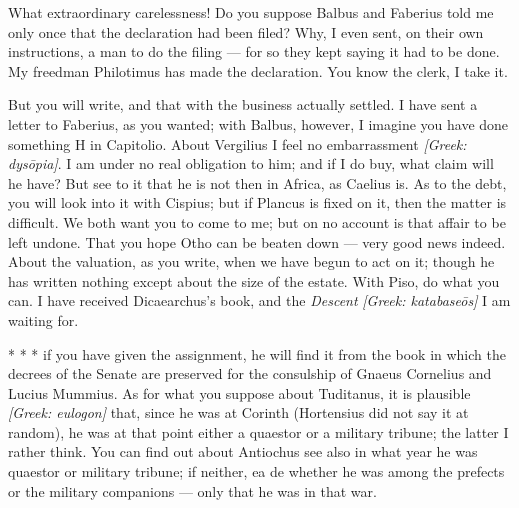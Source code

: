 

 What extraordinary carelessness! Do you suppose Balbus and Faberius told me only once that the declaration had been filed? Why, I even sent, on their own instructions, a man to do the filing --- for so they kept saying it had to be done. My freedman Philotimus has made the declaration. You know the clerk, I take it.

 But you will write, and that with the business actually settled. I have sent a letter to Faberius, as you wanted; with Balbus, however, I imagine you have done something \dag{}H in Capitolio\dag{}. About Vergilius I feel no embarrassment \textit{[Greek: dys\=opia]}. I am under no real obligation to him; and if I do buy, what claim will he have? But see to it that he is not then in Africa, as Caelius is. As to the debt, you will look into it with Cispius; but if Plancus is fixed on it, then the matter is difficult. We both want you to come to me; but on no account is that affair to be left undone. That you hope Otho can be beaten down --- very good news indeed. About the valuation, as you write, when we have begun to act on it; though he has written nothing except about the size of the estate. With Piso, do what you can. I have received Dicaearchus's book, and the \textit{Descent} \textit{[Greek: katabase\=os]} I \dag{}am waiting for\dag{}.

 * * * if you have given the assignment, he will find it from the book in which the decrees of the Senate are preserved for the consulship of Gnaeus Cornelius and Lucius Mummius. As for what you suppose about Tuditanus, it is plausible \textit{[Greek: eulogon]} that, since he was at Corinth (Hortensius did not say it at random), he was at that point either a quaestor or a military tribune; the latter I rather think. You can find out about Antiochus \dag{}see also\dag{} in what year he was quaestor or military tribune; if neither, \dag{}ea de\dag{} whether he was among the prefects or the military companions --- only that he was in that war.
